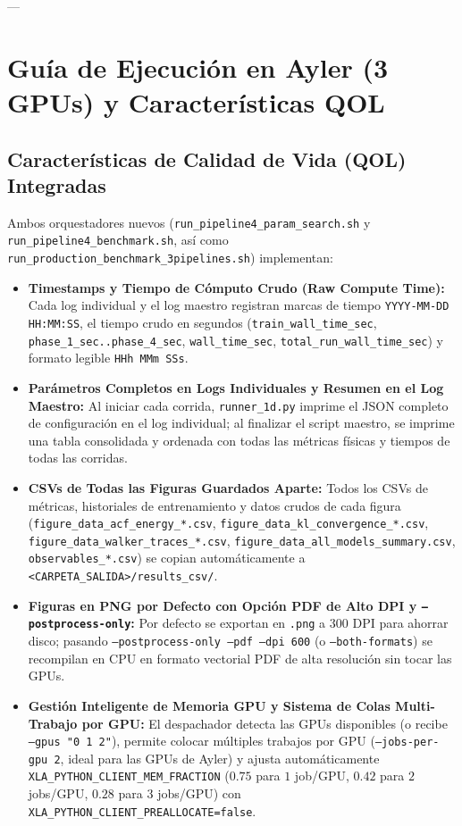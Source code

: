 \documentclass[10pt,a4paper]{article}
\begin{document}
---

\section{Gu\'ia de Ejecuci\'on en Ayler (3 GPUs) y Caracter\'isticas QOL}

\subsection{Caracter\'isticas de Calidad de Vida (QOL) Integradas}

Ambos orquestadores nuevos (\texttt{run\_pipeline4\_param\_search.sh} y \texttt{run\_pipeline4\_benchmark.sh}, as\'i como \texttt{run\_production\_benchmark\_3pipelines.sh}) implementan:
\begin{itemize}
\item \textbf{Timestamps y Tiempo de C\'omputo Crudo (Raw Compute Time):} Cada log individual y el log maestro registran marcas de tiempo \texttt{YYYY-MM-DD HH:MM:SS}, el tiempo crudo en segundos (\texttt{train\_wall\_time\_sec}, \texttt{phase\_1\_sec..phase\_4\_sec}, \texttt{wall\_time\_sec}, \texttt{total\_run\_wall\_time\_sec}) y formato legible \texttt{HHh MMm SSs}.
\item \textbf{Par\'ametros Completos en Logs Individuales y Resumen en el Log Maestro:} Al iniciar cada corrida, \texttt{runner\_1d.py} imprime el JSON completo de configuraci\'on en el log individual; al finalizar el script maestro, se imprime una tabla consolidada y ordenada con todas las m\'etricas f\'isicas y tiempos de todas las corridas.
\item \textbf{CSVs de Todas las Figuras Guardados Aparte:} Todos los CSVs de m\'etricas, historiales de entrenamiento y datos crudos de cada figura (\texttt{figure\_data\_acf\_energy\_*.csv}, \texttt{figure\_data\_kl\_convergence\_*.csv}, \texttt{figure\_data\_walker\_traces\_*.csv}, \texttt{figure\_data\_all\_models\_summary.csv}, \texttt{observables\_*.csv}) se copian autom\'aticamente a \texttt{<CARPETA\_SALIDA>/results\_csv/}.
\item \textbf{Figuras en PNG por Defecto con Opci\'on PDF de Alto DPI y \texttt{--postprocess-only}:} Por defecto se exportan en \texttt{.png} a $300\text{ DPI}$ para ahorrar disco; pasando \texttt{--postprocess-only --pdf --dpi 600} (o \texttt{--both-formats}) se recompilan en CPU en formato vectorial PDF de alta resoluci\'on sin tocar las GPUs.
\item \textbf{Gesti\'on Inteligente de Memoria GPU y Sistema de Colas Multi-Trabajo por GPU:} El despachador detecta las GPUs disponibles (o recibe \texttt{--gpus "0 1 2"}), permite colocar m\'ultiples trabajos por GPU (\texttt{--jobs-per-gpu 2}, ideal para las GPUs de Ayler) y ajusta autom\'aticamente \texttt{XLA\_PYTHON\_CLIENT\_MEM\_FRACTION} ($0.75$ para $1$ job/GPU, $0.42$ para $2$ jobs/GPU, $0.28$ para $3$ jobs/GPU) con \texttt{XLA\_PYTHON\_CLIENT\_PREALLOCATE=false}.
\end{itemize}
\end{document}
